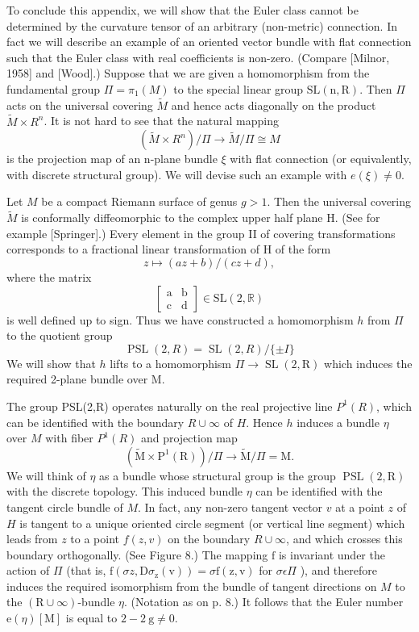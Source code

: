 \documentclass[10pt]{article}
\begin{document}
To conclude this appendix, we will show that the Euler class cannot be determined by the curvature tensor of an arbitrary (non-metric) connection. In fact we will describe an example of an oriented vector bundle with flat connection such that the Euler class with real coefficients is non-zero. (Compare [Milnor, 1958] and [Wood].) Suppose that we are given a homomorphism from the fundamental group $\Pi=\pi_{1}(M)$ to the special linear group $\mathrm{SL}(\mathrm{n}, \mathrm{R})$. Then $\Pi$ acts on the universal covering $\tilde{M}$ and hence acts diagonally on the product $\widetilde{M} \times R^{n}$. It is not hard to see that the natural mapping
$$
\left(\tilde{M} \times R^{n}\right) / \Pi \rightarrow \widetilde{M} / \Pi \cong M
$$
is the projection map of an n-plane bundle $\xi$ with flat connection (or equivalently, with discrete structural group). We will devise such an example with $e(\xi) \neq 0$.

Let $M$ be a compact Riemann surface of genus $g>1$. Then the universal covering $\widetilde{M}$ is conformally diffeomorphic to the complex upper half plane H. (See for example [Springer].) Every element in the group II of covering transformations corresponds to a fractional linear transformation of $\mathrm{H}$ of the form
$$
z \mapsto(a z+b) /(c z+d),
$$
where the matrix
$$
\left[\begin{array}{ll}
\mathrm{a} & \mathrm{b} \\
\mathrm{c} & \mathrm{d}
\end{array}\right] \in \mathrm{SL}(2, \mathbb{R})
$$
is well defined up to sign. Thus we have constructed a homomorphism $h$ from $\Pi$ to the quotient group
$$
\operatorname{PSL}(2, R)=\operatorname{SL}(2, R) /\{\pm I\}
$$
We will show that $h$ lifts to a homomorphism $\Pi \rightarrow \operatorname{SL}(2, \mathrm{R})$ which induces the required 2-plane bundle over M.

The group PSL(2,R) operates naturally on the real projective line $P^{1}(R)$, which can be identified with the boundary $R \cup \infty$ of $H$. Hence $h$ induces a bundle $\eta$ over $M$ with fiber $P^{1}(R)$ and projection map
$$
\left(\tilde{\mathrm{M}} \times \mathrm{P}^{1}(\mathrm{R})\right) / \Pi \rightarrow \tilde{\mathrm{M}} / \Pi=\mathrm{M} .
$$
We will think of $\eta$ as a bundle whose structural group is the group $\operatorname{PSL}(2, \mathrm{R})$ with the discrete topology. This induced bundle $\eta$ can be identified with the tangent circle bundle of $M$. In fact, any non-zero tangent vector $v$ at a point $z$ of $H$ is tangent to a unique oriented circle segment (or vertical line segment) which leads from $z$ to a point $f(z, v)$ on the boundary $R \cup \infty$, and which crosses this boundary orthogonally. (See Figure 8.) The mapping $\mathrm{f}$ is invariant under the action of $\Pi$ (that is, $\mathrm{f}\left(\sigma z, \mathrm{D} \sigma_{\mathrm{z}}(\mathrm{v})\right)=\sigma \mathrm{f}(\mathrm{z}, \mathrm{v})$ for $\sigma \epsilon \Pi$ ), and therefore induces the required isomorphism from the bundle of tangent directions on $M$ to the $(\mathrm{R} \cup \infty)$-bundle $\eta$. (Notation as on p. 8.) It follows that the Euler number $\mathrm{e}(\eta)[\mathrm{M}]$ is equal to $2-2 \mathrm{~g} \neq 0$.
\end{document}
